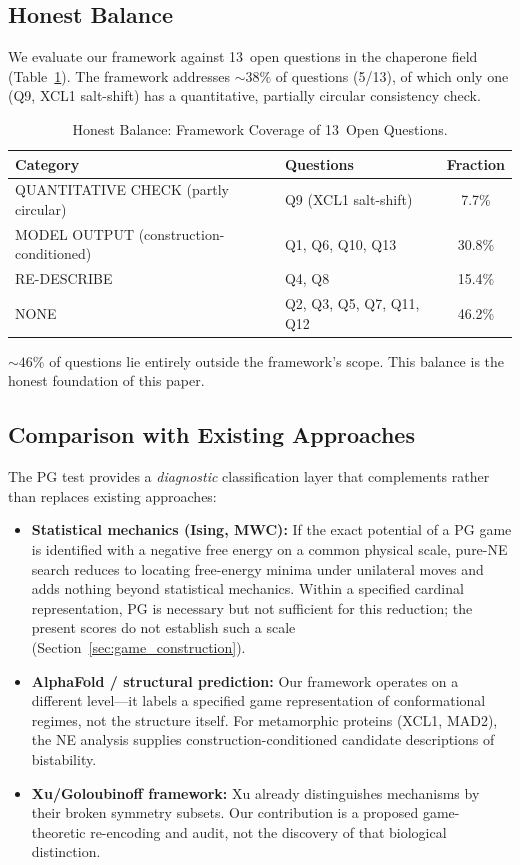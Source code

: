 \documentclass[12pt,a4paper]{article}
\begin{document}
\subsection{Honest Balance}

We evaluate our framework against 13~open questions in the chaperone
field (Table~\ref{tab:balance}). The framework addresses ${\sim}38\%$ of
questions (5/13), of which only one (Q9, XCL1 salt-shift) has a
quantitative, partially circular consistency check.

\begin{table}[!htbp]
\centering
\caption{Honest Balance: Framework Coverage of 13~Open Questions.}
\label{tab:balance}
\begin{tabular}{@{}llc@{}}
\toprule
Category & Questions & Fraction \\
\midrule
QUANTITATIVE CHECK (partly circular) & Q9 (XCL1 salt-shift) & 7.7\% \\
MODEL OUTPUT (construction-conditioned) & Q1, Q6, Q10, Q13 & 30.8\% \\
RE-DESCRIBE & Q4, Q8 & 15.4\% \\
NONE & Q2, Q3, Q5, Q7, Q11, Q12 & 46.2\% \\
\bottomrule
\end{tabular}
\end{table}

${\sim}46\%$ of questions lie entirely outside the framework's scope.
This balance is the honest foundation of this paper.

\subsection{Comparison with Existing Approaches}

The PG test provides a \emph{diagnostic} classification layer that
complements rather than replaces existing approaches:

\begin{itemize}
  \item \textbf{Statistical mechanics (Ising, MWC):} If the exact potential
    of a PG game is identified with a negative free energy on a common
    physical scale, pure-NE search reduces to locating free-energy minima
    under unilateral moves and adds nothing beyond statistical mechanics.
    Within a specified cardinal representation, PG is necessary but not
    sufficient for this reduction; the present scores do not establish
    such a scale (Section~\ref{sec:game_construction}).

  \item \textbf{AlphaFold / structural prediction:} Our framework
    operates on a different level---it labels a specified game representation
    of conformational regimes, not the structure itself. For metamorphic
    proteins (XCL1, MAD2), the NE analysis supplies
    construction-conditioned candidate descriptions of bistability.

  \item \textbf{Xu/Goloubinoff framework:} Xu already distinguishes
    mechanisms by their broken symmetry subsets. Our contribution is a
    proposed game-theoretic re-encoding and audit, not the discovery of
    that biological distinction.
\end{itemize}
\end{document}
